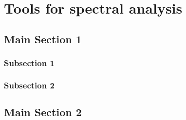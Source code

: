 %


\chapter{Tools for spectral analysis}  %

\label{Chapter2} 


\section{Main Section 1}



\subsection{Subsection 1}



\subsection{Subsection 2}


\section{Main Section 2}



